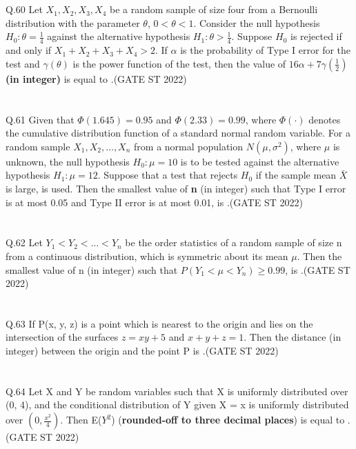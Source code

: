\documentclass[journal,12pt,onecolumn]{IEEEtran}
\theoremstyle{remark}
\begin{document}
\\
\\
Q.60 Let $X_1, X_2, X_3, X_4$ be a random sample of size four from a Bernoulli distribution with the parameter $\theta$, $0 < \theta < 1$. Consider the null hypothesis $H_0: \theta = \frac{1}{4}$ against the alternative hypothesis $H_1: \theta > \frac{1}{4}$. Suppose $H_0$ is rejected if and only if $X_1 + X_2 + X_3 + X_4 > 2$. If $\alpha$ is the probability of Type I error for the test and $\gamma(\theta)$ is the power function of the test, then the value of $16\alpha + 7 \gamma \left(\frac{1}{2}\right)$ \textbf{(in integer)} is equal to \underline{\hspace{5cm}}.\hfill (GATE ST 2022)\\
\\
\\
Q.61 Given that $\Phi(1.645) = 0.95$ and $\Phi(2.33) = 0.99$, where $\Phi(\cdot)$ denotes the cumulative distribution function of a standard normal random variable. For a random sample $X_1, X_2, \dots, X_n$ from a normal population $N(\mu, \sigma^2)$, where $\mu$ is unknown, the null hypothesis $H_0: \mu = 10$ is to be tested against the alternative hypothesis $H_1: \mu = 12$. Suppose that a test that rejects $H_0$ if the sample mean $\bar{X}$ is large, is used. Then the smallest value of \textbf{n} (in integer) such that Type I error is at most 0.05 and Type II error is at most 0.01, is \underline{\hspace{2cm}}.\hfill (GATE ST 2022)\\
\\
\\
Q.62 Let $Y_1 < Y_2 < \dots < Y_n$ be the order statistics of a random sample of size n from a continuous distribution, which is symmetric about its mean $\mu$. Then the smallest value of n (in integer) such that $P(Y_1 < \mu < Y_n) \geq 0.99$, is \underline{\hspace{2cm}}.\hfill (GATE ST 2022)\\
\\
\\
Q.63 If P(x, y, z) is a point which is nearest to the origin and lies on the intersection of the surfaces $z = xy + 5$ and $x + y + z = 1$. Then the distance (in integer) between the origin and the point P is \underline{\hspace{2cm}}.\hfill (GATE ST 2022)\\
\\
\\
Q.64 Let X and Y be random variables such that X is uniformly distributed over (0, 4), and the conditional distribution of Y given X = x is uniformly distributed over $(0, \frac{x^2}{4})$. Then E($Y^2$) (\textbf{rounded-off to three decimal places}) is equal to \underline{\hspace{2cm}}.\hfill (GATE ST 2022)\\
\end{document}
